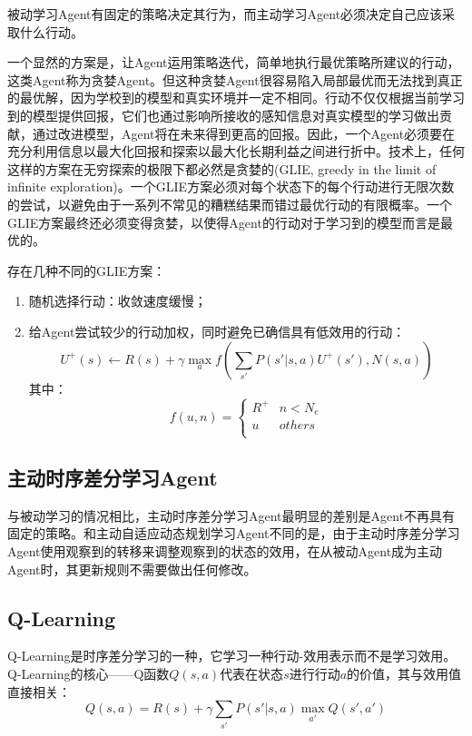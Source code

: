 \documentclass[a4paper]{ctexart}
\begin{document}
被动学习Agent有固定的策略决定其行为，而主动学习Agent必须决定自己应该采取什么行动。

一个显然的方案是，让Agent运用策略迭代，简单地执行最优策略所建议的行动，这类Agent称为贪婪Agent。但这种贪婪Agent很容易陷入局部最优而无法找到真正的最优解，因为学校到的模型和真实环境并一定不相同。行动不仅仅根据当前学习到的模型提供回报，它们也通过影响所接收的感知信息对真实模型的学习做出贡献，通过改进模型，Agent将在未来得到更高的回报。因此，一个Agent必须要在充分利用信息以最大化回报和探索以最大化长期利益之间进行折中。技术上，任何这样的方案在无穷探索的极限下都必然是贪婪的(GLIE, greedy in the limit of infinite exploration)。一个GLIE方案必须对每个状态下的每个行动进行无限次数的尝试，以避免由于一系列不常见的糟糕结果而错过最优行动的有限概率。一个GLIE方案最终还必须变得贪婪，以使得Agent的行动对于学习到的模型而言是最优的。

存在几种不同的GLIE方案：
\begin{enumerate}[label=\arabic*、]
	\item 随机选择行动：收敛速度缓慢；
	\item 给Agent尝试较少的行动加权，同时避免已确信具有低效用的行动：
	$$U^+(s)\leftarrow R(s)+\gamma\mathop{max}\limits_af\left(\sum_{s'}P(s'|s,a)U^+(s'),N(s,a)\right)$$
	其中：
	$$f(u,n)=\left\{
		\begin{aligned}
			R^+&n<N_e\\
			u&others\\
		\end{aligned}
	\right.$$
\end{enumerate}

\subsection{主动时序差分学习Agent}

与被动学习的情况相比，主动时序差分学习Agent最明显的差别是Agent不再具有固定的策略。和主动自适应动态规划学习Agent不同的是，由于主动时序差分学习Agent使用观察到的转移来调整观察到的状态的效用，在从被动Agent成为主动Agent时，其更新规则不需要做出任何修改。

\subsection{Q-Learning}

Q-Learning是时序差分学习的一种，它学习一种行动-效用表示而不是学习效用。Q-Learning的核心——Q函数$Q(s,a)$代表在状态$s$进行行动$a$的价值，其与效用值直接相关：
$$Q(s,a)=R(s)+\gamma\sum_{s'}P(s'|s,a)\mathop{max}\limits_{a'}Q(s',a')$$
\end{document}
